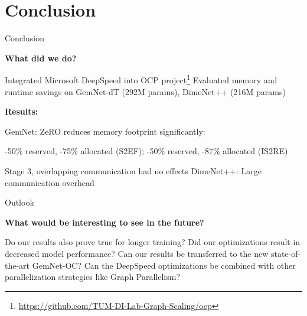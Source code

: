 \section{Conclusion}

\begin{frame}{Conclusion}
    \begin{small}
        \textbf{What did we do?} \vspace*{-0.3cm}\pause
        \begin{itemize}
            \bitem Integrated Microsoft DeepSpeed into OCP project\footnote{\url{https://github.com/TUM-DI-Lab-Graph-Scaling/ocp}} \vspace*{-0.3cm}\pause
            \bitem Evaluated memory and runtime savings on GemNet-dT (292M params), DimeNet++ (216M params) \vspace*{-0.3cm}\pause
        \end{itemize}
        \textbf{Results:} \vspace*{-0.3cm}
        \begin{itemize}
            \bitem GemNet: ZeRO reduces memory footprint significantly: \vspace*{-0.3cm} \\
            \begin{center}
                -50\% reserved, -75\% allocated (S2EF); -50\% reserved, -87\% allocated (IS2RE) \vspace*{-0.3cm}\pause
            \end{center}
            \bitem Stage 3, overlapping communication had no effects \vspace*{-0.3cm}\pause
            \bitem DimeNet++: Large communication overhead\pause
        \end{itemize}
    \end{small}
\end{frame}

\begin{frame}{Outlook}
    \begin{small}
        \textbf{What would be interesting to see in the future?}\pause
        \begin{itemize}
            \bitem Do our results also prove true for longer training?\pause
            \bitem Did our optimizations result in decreased model performance?\pause
            \bitem Can our results be transferred to the new state-of-the-art GemNet-OC?\pause
            \bitem Can the DeepSpeed optimizations be combined with other parallelization strategies 
            like Graph Parallelism?
        \end{itemize}
    \end{small}
\end{frame}